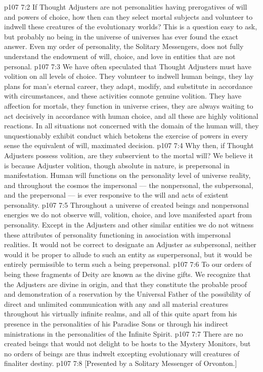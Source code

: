 \vs p107 7:2 If Thought Adjusters are not personalities having prerogatives of will and powers of choice, how then can they select mortal subjects and volunteer to indwell these creatures of the evolutionary worlds? This is a question easy to ask, but probably no being in the universe of universes has ever found the exact answer. Even my order of personality, the Solitary Messengers, does not fully understand the endowment of will, choice, and love in entities that are not personal.
\vs p107 7:3 We have often speculated that Thought Adjusters must have volition on all  levels of choice. They volunteer to indwell human beings, they lay plans for man’s eternal career, they adapt, modify, and substitute in accordance with circumstances, and these activities connote genuine volition. They have affection for mortals, they function in universe crises, they are always waiting to act decisively in accordance with human choice, and all these are highly volitional reactions. In all situations not concerned with the domain of the human will, they unquestionably exhibit conduct which betokens the exercise of powers in every sense the equivalent of will, maximated decision.
\vs p107 7:4 Why then, if Thought Adjusters possess volition, are they subservient to the mortal will? We believe it is because Adjuster volition, though absolute in nature, is prepersonal in manifestation. Human will functions on the personality level of universe reality, and throughout the cosmos the impersonal --- the nonpersonal, the subpersonal, and the prepersonal --- is ever responsive to the will and acts of existent personality.
\vs p107 7:5 Throughout a universe of created beings and nonpersonal energies we do not observe will, volition, choice, and love manifested apart from personality. Except in the Adjusters and other similar entities we do not witness these attributes of personality functioning in association with impersonal realities. It would not be correct to designate an Adjuster as subpersonal, neither would it be proper to allude to such an entity as superpersonal, but it would be entirely permissible to term such a being prepersonal.
\vs p107 7:6 \pc To our orders of being these fragments of Deity are known as the divine gifts. We recognize that the Adjusters are divine in origin, and that they constitute the probable proof and demonstration of a reservation by the Universal Father of the possibility of direct and unlimited communication with any and all material creatures throughout his virtually infinite realms, and all of this quite apart from his presence in the personalities of his Paradise Sons or through his indirect ministrations in the personalities of the Infinite Spirit.
\vs p107 7:7 There are no created beings that would not delight to be hosts to the Mystery Monitors, but no orders of beings are thus indwelt excepting evolutionary will creatures of finaliter destiny.
\vsetoff
\vs p107 7:8 [Presented by a Solitary Messenger of Orvonton.]
